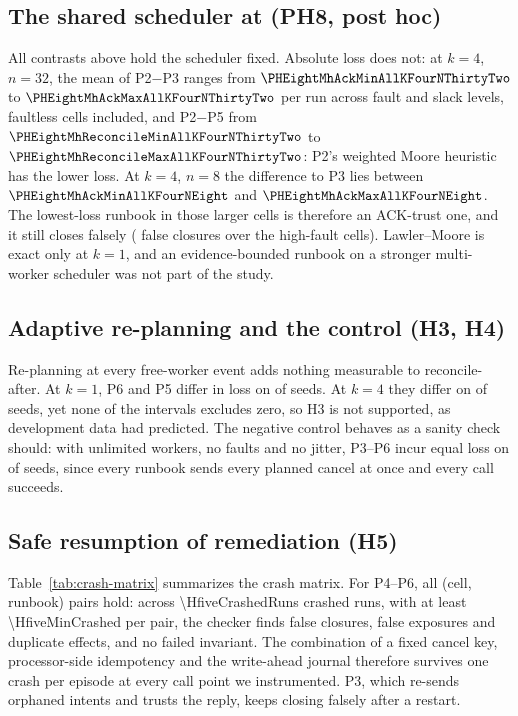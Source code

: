 \subsection{The shared scheduler at \texorpdfstring{}{multiple workers} (PH8, post hoc)}\label{sec:results:sched}
All contrasts above hold the scheduler fixed. Absolute loss does not: at $k = 4$, $n = 32$, the mean of P2$-$P3 ranges from $\PHEightMhAckMinAllKFourNThirtyTwo$ to $\PHEightMhAckMaxAllKFourNThirtyTwo$ per run across fault and slack levels, faultless cells included, and P2$-$P5 from $\PHEightMhReconcileMinAllKFourNThirtyTwo$ to $\PHEightMhReconcileMaxAllKFourNThirtyTwo$: P2's weighted Moore heuristic has the lower loss. At $k = 4$, $n = 8$ the difference to P3 lies between $\PHEightMhAckMinAllKFourNEight$ and $\PHEightMhAckMaxAllKFourNEight$. The lowest-loss runbook in those larger cells is therefore an ACK-trust one, and it still closes falsely (\FCMhHigh{} false closures over the high-fault cells). Lawler--Moore is exact only at $k = 1$, and an evidence-bounded runbook on a stronger multi-worker scheduler was not part of the study.

\subsection{Adaptive re-planning and the control (H3, H4)}\label{sec:results:h3h4}
Re-planning at every free-worker event adds nothing measurable to reconcile-after. At $k = 1$, P6 and P5 differ in loss on \HThreeNonzeroSeedsKOne{} of \HThreeSeedsKOne{} seeds. At $k = 4$ they differ on \HThreeNonzeroSeedsKFour{} of \HThreeSeedsKFour{} seeds, yet none of the \HThreeCellsKFour{} intervals excludes zero, so H3 is not supported, as development data had predicted. The negative control behaves as a sanity check should: with unlimited workers, no faults and no jitter, P3--P6 incur equal loss on \NegCtrlSeedsEqual{} of \NegCtrlSeeds{} seeds, since every runbook sends every planned cancel at once and every call succeeds.



\subsection{Safe resumption of remediation (H5)}\label{sec:results:h5}
Table~\ref{tab:crash-matrix} summarizes the crash matrix. For P4--P6, all \HfiveCellsHold{} (cell, runbook) pairs hold: across \num{\HfiveCrashedRuns} crashed runs, with at least \num{\HfiveMinCrashed} per pair, the checker finds \HfiveFalseClosures{} false closures, \HfiveFalseExposures{} false exposures and \HfiveDuplicateEffects{} duplicate effects, and no failed invariant. The combination of a fixed cancel key, processor-side idempotency and the write-ahead journal therefore survives one crash per episode at every call point we instrumented. P3, which re-sends orphaned intents and trusts the reply, keeps closing falsely after a restart.

